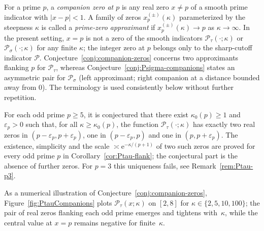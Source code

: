 \begin{definition}\label{def:zero-terminology}
For a prime $p$, a \emph{companion zero at $p$} is any real zero $x\neq p$ of a smooth prime indicator with $|x-p|<1$. A family of zeros $x_p^{(\pm)}(\kappa)$ parameterized by the steepness $\kappa$ is called a \emph{prime-zero approximant} if $x_p^{(\pm)}(\kappa)\to p$ as $\kappa\to\infty$.
In the present setting, $x=p$ is not a zero of the smooth indicators $\mathcal P_\tau(\cdot;\kappa)$ or $\mathcal P_\sigma(\cdot;\kappa)$ for any finite $\kappa$; the integer zero at $p$ belongs only to the sharp-cutoff indicator $\mathcal P$.
Conjecture~\ref{conj:companion-zeros} concerns two approximants flanking $p$ for $\mathcal P_\tau$, whereas Conjecture~\ref{conj:Psigma-companions} states an asymmetric pair for $\mathcal P_\sigma$ (left approximant; right companion at a distance bounded away from $0$). The terminology is used consistently below without further repetition.
\end{definition}

\begin{conjecture}\label{conj:companion-zeros}
For each odd prime $p\ge 5$, it is conjectured that there exist $\kappa_0(p)\ge 1$ and $\varepsilon_p>0$ such that, for all $\kappa\ge \kappa_0(p)$, the function $\mathcal P_\tau(\cdot;\kappa)$ has exactly two real zeros in $(p-\varepsilon_p,p+\varepsilon_p)$, one in $(p-\varepsilon_p,p)$ and one in $(p,p+\varepsilon_p)$. The existence, simplicity and the scale $\asymp\mathrm e^{-\kappa/(p+1)}$ of two such zeros are proved for every odd prime $p$ in Corollary~\ref{cor:Ptau-flank}; the conjectural part is the absence of further zeros. For $p=3$ this uniqueness fails, see Remark~\ref{rem:Ptau-p3}.
\end{conjecture}

As a numerical illustration of Conjecture~\ref{conj:companion-zeros}, 
Figure~\ref{fig:PtauCompanions} plots $\mathcal P_\tau(x;\kappa)$ on $[2,8]$ for 
$\kappa\in\{2,5,10,100\}$; the pair of real zeros flanking each odd prime emerges and tightens 
with~$\kappa$, while the central value at $x=p$ remains negative for finite~$\kappa$.


